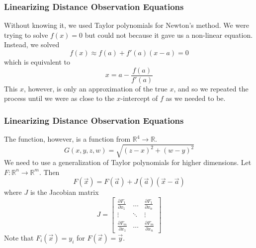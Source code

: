 \documentclass[xcolor=dvipsnames]{beamer}
\begin{document}
\begin{frame}
  \frametitle{Linearizing Distance Observation Equations}
  Without knowing it, we used Taylor polynomials for Newton's method.
  We were trying to solve $f(x)=0$ but could not because it gave us a
  non-linear equation. Instead, we solved
  \begin{equation}
    \label{eq:vifahtuu}
    f(x)\approx{}f(a)+f'(a)(x-a)=0
  \end{equation}
  which is equivalent to
  \begin{equation}
    \label{eq:noopheij}
    x=a-\frac{f(a)}{f'(a)}
  \end{equation}
This $x$, however, is only an approximation of the true $x$, and so we
repeated the process until we were as close to the $x$-intercept of
$f$ as we needed to be.
\end{frame}

\begin{frame}
  \frametitle{Linearizing Distance Observation Equations}
  The function, however, is a function from
  $\mathbb{R}^{4}\rightarrow\mathbb{R}$.
  \begin{equation}
    \label{eq:oochohda}
G(x,y,z,w)=\sqrt{(z-x)^{2}+(w-y)^{2}}    
  \end{equation}
  We need to use a generalization of Taylor polynomials for higher
  dimensions. Let $F:\mathbb{R}^{n}\rightarrow\mathbb{R}^{m}$. Then
\begin{equation}
  \label{eq:ohvoidei}
 F(\vec{x})=F(\vec{a})+J(\vec{a})(\vec{x}-\vec{a}) 
\end{equation}
where $J$ is the Jacobian matrix
\begin{equation}
  \label{eq:ooveitho}
  J=\left[\begin{array}{ccc}
     \frac{\partial F_1}{\partial x_1} & {\ldots} & \frac{\partial F_1}{\partial x_n} \\
     {\vdots} & {\ddots} & {\vdots} \\
     \frac{\partial F_m}{\partial x_1} & {\ldots} & \frac{\partial F_m}{\partial x_n}
\end{array}\right]
\end{equation}
Note that $F_{i}(\vec{x})=y_{i}$ for $F(\vec{x})=\vec{y}$. 
\end{frame}
\end{document}
